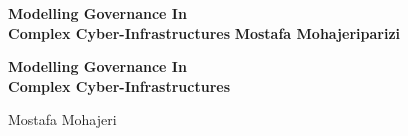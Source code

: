 {\pagestyle{empty}
\newcommand{\printtitle}{%
{\Huge\bfseries Modelling Governance In\\[0.8cm] Complex Cyber-Infrastructures}}    %

\begin{titlepage}
\par\vskip 2cm
\begin{center}
\printtitle
\vfill
{\LARGE\bfseries Mostafa Mohajeriparizi}                           %
\vskip 2cm
\end{center}
\end{titlepage}
%
%
\mbox{}\newpage
\setcounter{page}{1}

\par\vskip 2cm
\begin{center}
\printtitle \\
\par\vskip 2cm
Mostafa Mohajeri
\end{center}

\clearpage
\par\vskip 2cm
\begin{center}
~\\~
\end{center}
\vfill

}

